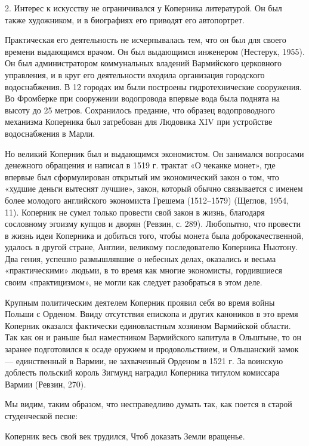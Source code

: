 2. Интерес  к искусству не  ограничивался у Коперника  литературой. Он
был также художником, и в биографиях его приводят его автопортрет.

Практическая  его  деятельность  не  исчерпывалась  тем,  что  он  был
для  своего времени  выдающимся  врачом. Он  был выдающимся  инженером
(Нестерук,  1955).   Он  был  администратором   коммунальных  владений
Вармийского церковного  управления, и в круг  его деятельности входила
организация городского  водоснабжения. В 12 городах  им были построены
гидротехнические сооружения.  Во Фромберке при  сооружении водопровода
впервые  вода  была  поднята  на  высоту  до  25  метров.  Сохранилось
предание,   что  образец   водопроводного   механизма  Коперника   был
затребован для Людовика XIV при устройстве водоснабжения в Марли.

Но  великий  Коперник  был  и  выдающимся  экономистом.  Он  занимался
вопросами денежного обращения  и написал в 1519 г.  трактат «О чеканке
монет», где впервые был  сформулирован открытый им экономический закон
о  том, что  «худшие деньги  вытеснят лучшие»,  закон, который  обычно
связывается  с именем  более молодого  английского экономиста  Грешема
(1512--1579)  (Щеглов, 1954,  11). Коперник  не сумел  только провести
свой  закон в  жизнь,  благодаря сословному  эгоизму  купцов и  дворян
(Ревзин,  с. 289).  Любопытно,  что провести  в  жизнь идеи  Коперника
и  добиться  того,  чтобы  монета была  доброкачественной,  удалось  в
другой стране,  Англии, великому последователю Коперника  Ньютону. Два
гения,  успешно  размышлявшие о  небесных  делах,  оказались и  весьма
«практическими» людьми, в то  время как многие экономисты, гордившиеся
своим «практицизмом», не могли как следует разобраться в этом деле.

Крупным  политическим деятелем  Коперник проявил  себя во  время войны
Польши  с  Орденом.  Ввиду  отсутствия  епископа  и  других  каноников
в  это  время  Коперник  оказался  фактически  единовластным  хозяином
Вармийской области.  Так как он  и раньше был  наместником Вармийского
капитула  в Ольштыне,  то он  заранее подготовился  к осаде  оружием и
продовольствием,  и Ольшанский  замок  --- единственный  в Вармии,  не
захваченный Орденом  в 1521  г. За  воинскую доблесть  польский король
Зигмунд наградил Коперника титулом комиссара Вармии (Ревзин, 270).

Мы видим,  таким образом, что  несправедливо думать так, как  поется в
старой студенческой песне:

Коперник весь свой век трудился, Чтоб доказать Земли вращенье.

